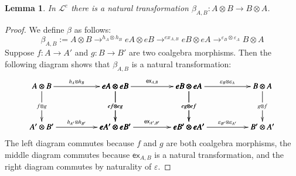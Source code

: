 \documentclass{article}
\newtheorem{lemma}[theorem]{Lemma}
\let\mto\to
\let\to\relax
\newcommand{\to}{\rightarrow}
\newcommand{\cat}[1]{\mathcal{#1}}
\newcommand{\e}[1]{\mathsf{ex}_{#1}}
\begin{document}
\begin{lemma}
  \label{lemma:pseudo-braided}
  In $\cat{L}^e$ there is a natural transformation $\beta_{A,B} : A \otimes B \mto B \otimes A$.
\end{lemma}
\begin{proof}
  We define $\beta$ as follows:
  \[
  \beta_{A,B} := A \otimes B \mto^{h_A \otimes h_B} eA \otimes eB \mto^{ex_{A,B}} eB \otimes eA \mto^{\varepsilon_B \otimes \varepsilon_A} B \otimes A
  \]
  Suppose $f : A \mto A'$ and $g : B \mto B'$ are two coalgebra
  morphisms.  Then the following diagram shows that $\beta_{A,B}$ is a
  natural transformation:
  \[
  \bfig
  \square|amma|<900,500>[
    A \otimes B`
    eA \otimes eB`
    A' \otimes B'`
    eA' \otimes eB';
    h_A \otimes h_B`
    f \otimes g`
    ef \otimes eg`
    h_{A'} \otimes h_{B'}]

  \square(900,0)|amma|<900,500>[
    eA \otimes eB`
    eB \otimes eA`
    eA' \otimes eB'`
    eB' \otimes eA';
    \e{A,B}`
    ef \otimes eg`
    eg \otimes ef`
    \e{A',B'}]

  \square(1800,0)|amma|<900,500>[
    eB \otimes eA`
    B \otimes A`
    eB' \otimes eA'`
    B' \otimes A';
    \varepsilon_{B} \otimes \varepsilon_{A}`
    eg \otimes ef`
    g \otimes f`
    \varepsilon_{B'} \otimes \varepsilon_{A'}]
  \efig
  \]
  The left diagram commutes because $f$ and $g$ are both coalgebra
  morphisms, the middle diagram commutes because $\e{A,B}$ is a
  natural transformation, and the right diagram commutes by naturality
  of $\varepsilon$.
\end{proof}
\end{document}
